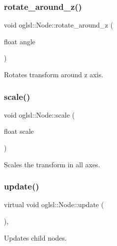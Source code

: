 \subsubsection{\texorpdfstring{rotate\+\_\+around\+\_\+z()}{rotate\_around\_z()}}
{\footnotesize\ttfamily void oglsl\+::\+Node\+::rotate\+\_\+around\+\_\+z (\begin{DoxyParamCaption}\item[{float}]{angle }\end{DoxyParamCaption})\hspace{0.3cm}{\ttfamily [inline]}}



Rotates transform around z axis. 

\mbox{\label{classoglsl_1_1_node_a331a350e8311a310a77a109e6af6d135}} 
\subsubsection{\texorpdfstring{scale()}{scale()}}
{\footnotesize\ttfamily void oglsl\+::\+Node\+::scale (\begin{DoxyParamCaption}\item[{float}]{scale }\end{DoxyParamCaption})\hspace{0.3cm}{\ttfamily [inline]}}



Scales the transform in all axes. 

\mbox{\label{classoglsl_1_1_node_af0c785449427102ed6922ea82e994577}} 
\subsubsection{\texorpdfstring{update()}{update()}}
{\footnotesize\ttfamily virtual void oglsl\+::\+Node\+::update (\begin{DoxyParamCaption}{ }\end{DoxyParamCaption})\hspace{0.3cm}{\ttfamily [inline]}, {\ttfamily [virtual]}}



Updates child nodes. 



